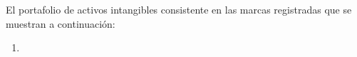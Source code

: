 El portafolio de activos intangibles consistente en las marcas registradas que se muestran a continuaci\'on:
\begin{enumerate}
\item
\end{enumerate}
